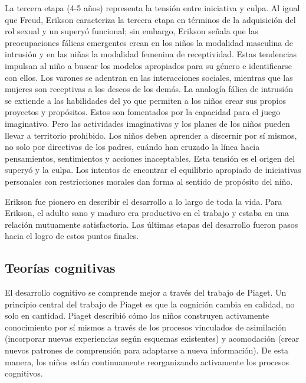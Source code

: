 \documentclass[11pt,letterpaper]{report}
\begin{document}
La tercera etapa (4-5 años) representa la tensión entre iniciativa y culpa. Al
igual que Freud, Erikson caracteriza la tercera etapa en términos de la
adquisición del rol sexual y un superyó funcional; sin embargo, Erikson señala
que las preocupaciones fálicas emergentes crean en los niños la modalidad
masculina de intrusión y en las niñas la modalidad femenina de receptividad.
Estas tendencias impulsan al niño a buscar los modelos apropiados para su
género e identificarse con ellos. Los varones se adentran en las interacciones
sociales, mientras que las mujeres son receptivas a los deseos de los demás. La
analogía fálica de intrusión se extiende a las habilidades del yo que permiten
a los niños crear sus propios proyectos y propósitos. Estos son fomentados por
la capacidad para el juego imaginativo. Pero las actividades imaginativas y los
planes de los niños pueden llevar a territorio prohibido. Los niños deben
aprender a discernir por sí mismos, no solo por directivas de los padres,
cuándo han cruzado la línea hacia pensamientos, sentimientos y acciones
inaceptables. Esta tensión es el origen del superyó y la culpa. Los intentos
de encontrar el equilibrio apropiado de iniciativas personales con restricciones
morales dan forma al sentido de propósito del niño. \cite{Feldman3}

Erikson fue pionero en describir el desarrollo a lo largo de toda la vida. Para
Erikson, el adulto sano y maduro era productivo en el trabajo y estaba en una
relación mutuamente satisfactoria. Las últimas etapas del desarrollo fueron
pasos hacia el logro de estos puntos finales. \cite{Feldman3}

\subsection{Teorías cognitivas}
El desarrollo cognitivo se comprende mejor a través del trabajo de Piaget. Un
principio central del trabajo de Piaget es que la cognición cambia en calidad,
no solo en cantidad. Piaget describió cómo los niños construyen activamente
conocimiento por sí mismos a través de los procesos vinculados de asimilación
(incorporar nuevas experiencias según esquemas existentes) y acomodación (crear
nuevos patrones de comprensión para adaptarse a nueva información). De esta
manera, los niños están continuamente reorganizando activamente los procesos
cognitivos. \cite{Nelson19}
\end{document}
